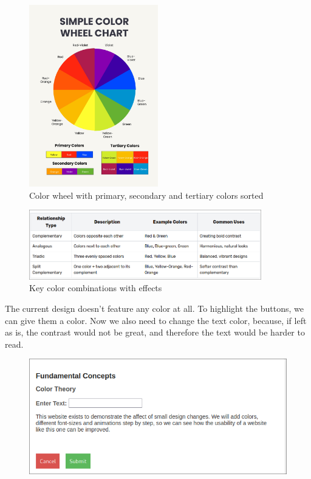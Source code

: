 \begin{figure} [H]
    \center
    \includegraphics [width=0.5\textwidth] {images/paul/colorWheel.jpg}
    \caption{Color wheel with primary, secondary and tertiary colors sorted \autocite{ColorWheel:Img}}
\end{figure}

\begin{figure} [H]
    \centering
    \includegraphics [width=0.9\textwidth] {images/paul/colorRelations.png}
    \caption{Key color combinations with effects \autocite{ColorRelationsTable}}
\end{figure}

\newpage

The current design doesn't feature any color at all. To highlight the buttons, we can give them a color. Now we also need to change the text color, because, if left as is, the contrast would not be great, and therefore the text would be harder to read. \autocite{Paul:ColorTheoryForBeginners}
    
    \begin{figure} [H]
        \center
        \includegraphics [width=1\textwidth] {images/paul/usabilityExamples/ColorTheoryExample.png}
        \caption{}
    \end{figure}

